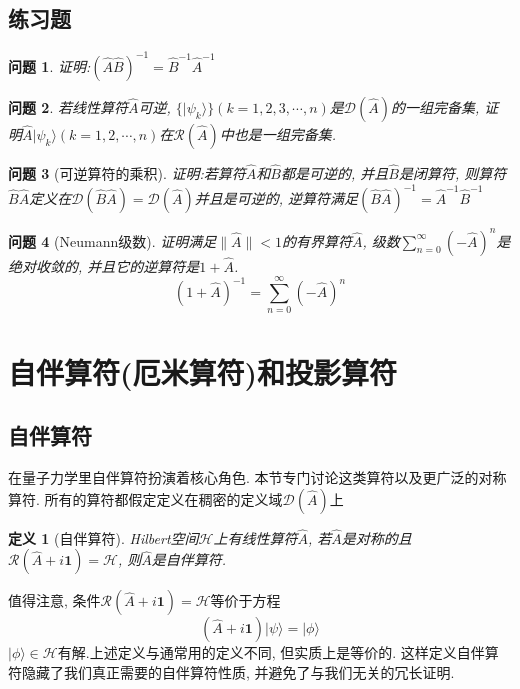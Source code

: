 \documentclass[a4paper,11pt]{book}
\newtheorem{definition}{\hspace{2em}定义}[section]
\newtheorem{problem}{问题}[section]
\begin{document}
\subsection{练习题}
\begin{problem}
  证明:$(\hat{A}\hat{B})^{-1}=\hat{B}^{-1}\hat{A}^{-1}$
\end{problem}
\begin{problem}
  若线性算符$\hat{A}$可逆, $\{|\psi_k\rangle\}(k=1,2,3,\cdots,n)$是$\mathcal{D}(\hat{A})$的一组完备集, 证明${\hat{A}|\psi_k\rangle}(k=1,2,\cdots,n)$在$\mathcal{R}(\hat{A})$中也是一组完备集.
\end{problem}
\begin{problem}[可逆算符的乘积]
  证明:若算符$\hat{A}$和$\hat{B}$都是可逆的, 并且$\hat{B}$是闭算符, 则算符$\hat{B}\hat{A}$定义在$\mathcal{D}(\hat{B}\hat{A})=\mathcal{D}(\hat{A})$并且是可逆的, 逆算符满足$(\hat{B}\hat{A})^{-1}=\hat{A}^{-1}\hat{B}^{-1}$
\end{problem}
\begin{problem}[Neumann级数]\label{Neumann series}
  证明满足$\|\hat{A}\|<1$的有界算符$\hat{A}$, 级数$\sum_{n=0}^{\infty}(-\hat{A})^n$是绝对收敛的, 并且它的逆算符是$1+\hat{A}$.
\begin{equation*}
  (1+\hat{A})^{-1}=\sum_{n=0}^{\infty}(-\hat{A})^n
\end{equation*}
\end{problem}
\section{自伴算符(厄米算符)和投影算符}
\subsection{自伴算符}
在量子力学里自伴算符扮演着核心角色. 本节专门讨论这类算符以及更广泛的对称算符. 所有的算符都假定定义在稠密的定义域$\mathcal{D}(\hat{A})$上
\begin{definition}[自伴算符]\label{Self-adjoint def 1}
  Hilbert空间$\mathcal{H}$上有线性算符$\hat{A}$, 若$\hat{A}$是对称的且$\mathcal{R}(\hat{A}+i\mathbf{1})=\mathcal{H}$, 则$\hat{A}$是自伴算符.
\end{definition}
值得注意, 条件$\mathcal{R}(\hat{A}+i\mathbf{1})=\mathcal{H}$等价于方程
\begin{equation*}
  (\hat{A}+i\mathbf{1})|\psi\rangle=|\phi\rangle
\end{equation*}
$|\phi\rangle\in\mathcal{H}$有解.上述定义与通常用的定义不同, 但实质上是等价的. 这样定义自伴算符隐藏了我们真正需要的自伴算符性质, 并避免了与我们无关的冗长证明.
\end{document}
